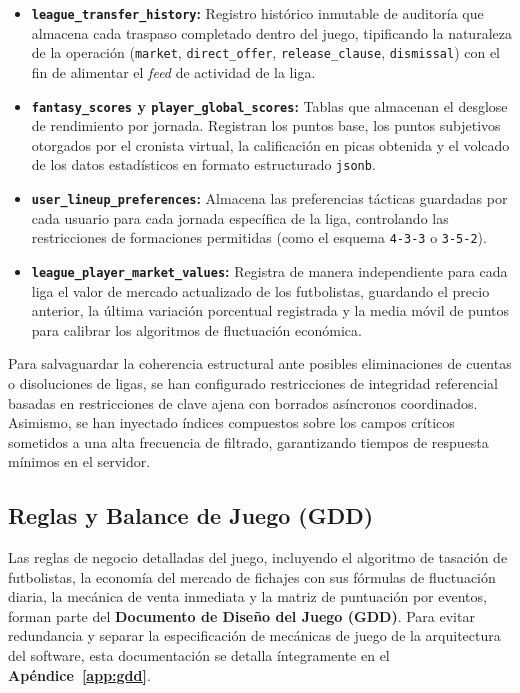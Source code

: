 \begin{itemize}
    \item \textbf{\texttt{league\_transfer\_history}:} Registro histórico inmutable de auditoría que almacena cada traspaso completado dentro del juego, tipificando la naturaleza de la operación (\texttt{market}, \texttt{direct\_offer}, \texttt{release\_clause}, \texttt{dismissal}) con el fin de alimentar el \textit{feed} de actividad de la liga.
    \item \textbf{\texttt{fantasy\_scores} y \texttt{player\_global\_scores}:} Tablas que almacenan el desglose de rendimiento por jornada. Registran los puntos base, los puntos subjetivos otorgados por el cronista virtual, la calificación en picas obtenida y el volcado de los datos estadísticos en formato estructurado \texttt{jsonb}.
    \item \textbf{\texttt{user\_lineup\_preferences}:} Almacena las preferencias tácticas guardadas por cada usuario para cada jornada específica de la liga, controlando las restricciones de formaciones permitidas (como el esquema \texttt{4-3-3} o \texttt{3-5-2}).
    \item \textbf{\texttt{league\_player\_market\_values}:} Registra de manera independiente para cada liga el valor de mercado actualizado de los futbolistas, guardando el precio anterior, la última variación porcentual registrada y la media móvil de puntos para calibrar los algoritmos de fluctuación económica.
\end{itemize}

Para salvaguardar la coherencia estructural ante posibles eliminaciones de cuentas o disoluciones de ligas, se han configurado restricciones de integridad referencial basadas en restricciones de clave ajena con borrados asíncronos coordinados. Asimismo, se han inyectado índices compuestos sobre los campos críticos sometidos a una alta frecuencia de filtrado, garantizando tiempos de respuesta mínimos en el servidor.


\subsection{Reglas y Balance de Juego (GDD)}
Las reglas de negocio detalladas del juego, incluyendo el algoritmo de tasación de futbolistas, la economía del mercado de fichajes con sus fórmulas de fluctuación diaria, la mecánica de venta inmediata y la matriz de puntuación por eventos, forman parte del \textbf{Documento de Diseño del Juego (GDD)}. Para evitar redundancia y separar la especificación de mecánicas de juego de la arquitectura del software, esta documentación se detalla íntegramente en el \textbf{Apéndice~\ref{app:gdd}}.

